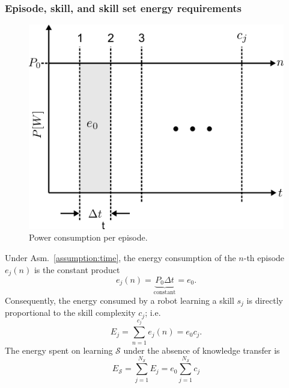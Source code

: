 \subsubsection{\textbf{Episode, skill, and skill set energy requirements}}
\begin{figure}[!t]
	\centering
	\includegraphics[width=0.95\columnwidth]{fig/power_per_episode.png}
	\caption{Power consumption per episode.}
	\label{fig:power_per_episode}
\end{figure}
Under Asm.~\ref{assumption:time}, the energy consumption of the $n$-th episode $e_j(n)$ is the constant product
\begin{equation}\label{eq:energy_per_episode}
    e_j(n) = \underbrace{P_0 \Delta t}_{\text{constant}} = e_0.
\end{equation}
Consequently, the energy consumed by a robot learning a skill $ s_j $ is directly proportional to the skill complexity $c_j$; i.e.
\begin{equation}\label{eq:energy_per_skill}
    E_j =\sum_{n=1}^{c_j} e_j(n) = e_0c_j.
\end{equation}
The energy spent on learning $\mathcal{S}$ under the absence of knowledge transfer is
\begin{equation}\label{eq:total_energy}
	E_{\mathcal{S}} = \sum_{j=1}^{{N_{\mathcal{S}}}} E_j = e_0 \sum_{j=1}^{{N_{\mathcal{S}}}} c_j%
\end{equation}
